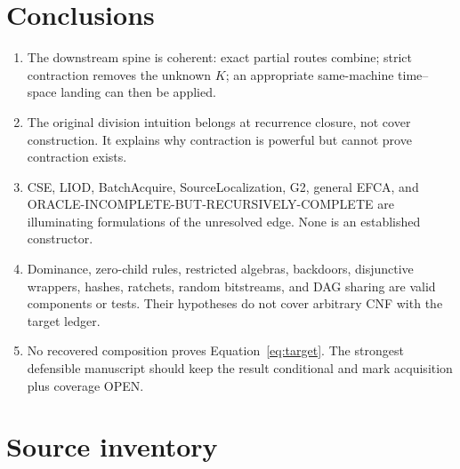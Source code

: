 \documentclass[11pt]{article}
\begin{document}
\section{Conclusions}

\begin{enumerate}
  \item The downstream spine is coherent: exact partial routes combine; strict contraction removes the unknown $K$; an appropriate same-machine time--space landing can then be applied.
  \item The original division intuition belongs at recurrence closure, not cover construction.  It explains why contraction is powerful but cannot prove contraction exists.
  \item CSE, LIOD, BatchAcquire, SourceLocalization, G2, general EFCA, and ORACLE-INCOMPLETE-BUT-RECURSIVELY-COMPLETE are illuminating formulations of the unresolved edge.  None is an established constructor.
  \item Dominance, zero-child rules, restricted algebras, backdoors, disjunctive wrappers, hashes, ratchets, random bitstreams, and DAG sharing are valid components or tests.  Their hypotheses do not cover arbitrary CNF with the target ledger.
  \item No recovered composition proves Equation~\ref{eq:target}.  The strongest defensible manuscript should keep the result conditional and mark acquisition plus coverage OPEN.
\end{enumerate}

\section*{Source inventory}
\vspace{-15pt}
\end{document}
